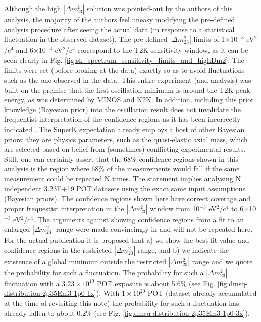 Although the high $|\Delta m^{2}_{23}|$ solution was pointed-out by the authors of this analysis,
the majority of the authors feel uneasy modifying the pre-defined analysis procedure 
after seeing the actual data (in response to a statistical fluctuation in the observed dataset).
The pre-defined $|\Delta m^{2}_{23}|$ limits of 1$\times$10$^{-3}$ eV$^{2}$/c$^{4}$ and 6$\times$10$^{-3}$ eV$^{2}$/c$^{4}$
correspond to the T2K sensitivity window, as it can be seen clearly in Fig. \ref{fig:sk_spectrum_sensitivity_limits_and_highDm2}.
The limits were set (before looking at the data) exactly so as to avoid fluctuations such as the one observed in the data.
This entire experiment (and analysis) was built on the premise that the first oscillation minimum is around the T2K peak energy,
as was determined by MINOS and K2K. 
In addition, including this prior knowledge (Bayesian prior) into the oscillation result does
not invalidate the frequentist interpretation of the confidence regions as it has been incorrectly indicated \cite{Mauro}.
The SuperK expectation already employs a host of other Bayesian priors;
they are physics parameters, such as the quasi-elastic axial mass, which are selected based on belief from
(sometimes) conflicting experimental results.
Still, one can certainly assert that the 68\% confidence regions shown in this analysis is the region where 68\% of the 
measurements would fall if the same measurement could be repeated N times. 
The statement implies analysing N independent 3.23E+19 POT datasets using the exact same input assumptions (Bayesian priors).
The confidence regions shown here have correct coverage and proper frequestist interpretation 
in the $|\Delta m^{2}_{23}|$ window
from 10$^{-3}$ eV$^{2}$/c$^{4}$ to 6$\times$10$^{-3}$ eV$^{2}$/c$^{4}$.
The arguments against showing confidence regions from a fit to an enlarged $|\Delta m^{2}_{23}|$ range were made 
convincingly in \cite{DeanAndNick} and will not be repeated here. 
For the actual publication it is proposed that 
a) we show the best-fit value and confidence regions in the restricted $|\Delta m^{2}_{23}|$ range, and 
b) we indicate the existence of a global minimum outside the restricted $|\Delta m^{2}_{23}|$ range
   and we quote the probability for such a fluctuation.
The probability for such a $|\Delta m^{2}_{23}|$ fluctuation with a $3.23\times10^{19}$ POT exposure is
about 5.6\% (see Fig. \ref{fig:dmsq-distribution-2p35Em3-1p0-1x}). With $1\times10^{20}$ POT (dataset already accumulated at the time of revisiting
this note) the probability for such a fluctuation has already fallen to about 0.2\% (see Fig. \ref{fig:dmsq-distribution-2p35Em3-1p0-3x}).

